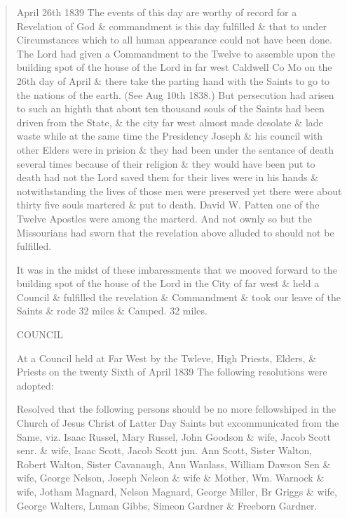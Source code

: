 		\begin{quote}
			April 26th 1839 The events of this day are worthy of record for a Revelation of God \& commandment is this day fulfilled \& that to under Circumstances which to all human  appearance could not have been done. The Lord had given a Commandment to the Twelve to assemble upon the building spot of the house of the Lord in far west Caldwell Co Mo on the 26th day of April \& there take the parting hand with the Saints to go to the nations of the earth. (See Aug 10th 1838.) But persecution had arisen to such an highth that about ten thousand souls of the Saints had been driven from the State, \& the city far west almost made desolate \& lade waste while at the same time the Presidency Joseph \& his council with other Elders were in prision \& they had been under the sentance of death several times because of their religion \& they would have been put to death had not the Lord saved them for their lives were in his hands \& notwithstanding the lives of those men were preserved yet there were about thirty five souls martered \& put to death. David W. Patten one of the Twelve Apostles were among the marterd. And not ownly so but the Missourians had sworn that the revelation above alluded to should not be fulfilled.
			
			It was in the midst of these imbaressments that we mooved forward to the building spot of the house of the Lord in the City of far west \& held a Council \& fulfilled the revelation \& Commandment \& took our leave of the Saints \& rode 32 miles \& Camped. 32 miles.
			
			\begin{center}
				COUNCIL
			\end{center}

			At a Council held at Far West by the Twleve, High Priests, Elders, \& Priests on the twenty Sixth of April 1839 The following resolutions were adopted:

			Resolved that the following persons should be no more fellowshiped in the Church of Jesus Christ of Latter Day Saints but excommunicated from the Same, viz. Isaac Russel, Mary Russel, John Goodson \& wife, Jacob Scott senr. \& wife, Isaac Scott, Jacob Scott jun. Ann Scott, Sister Walton, Robert Walton, Sister Cavanaugh, Ann Wanlass, William Dawson Sen \& wife, George Nelson, Joseph Nelson \& wife \& Mother, Wm. Warnock \& wife, Jotham Magnard, Nelson Magnard, George Miller, Br Griggs \& wife, George  Walters, Luman Gibbs, Simeon Gardner \& Freeborn Gardner.
			

\end{quote}
